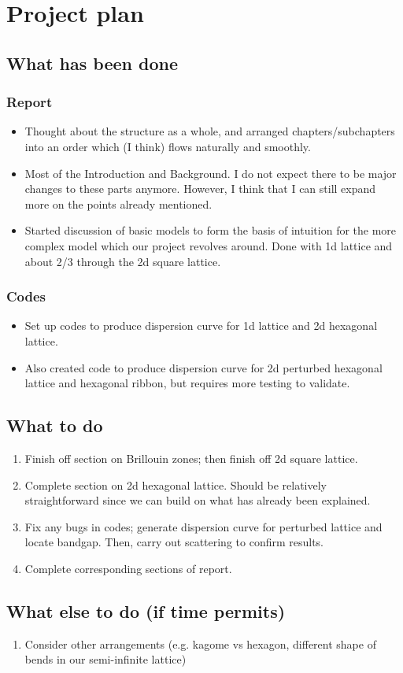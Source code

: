 \chapter{Project plan}

\section{What has been done}

\subsection{Report}
\begin{itemize}
  \item Thought about the structure as a whole, and arranged
        chapters/subchapters into an order which (I think) flows naturally and
        smoothly.
  \item Most of the Introduction and Background. I do not expect there to be
        major changes to these parts anymore. However, I think that I can still
        expand more on the points already mentioned.
  \item Started discussion of basic models to form the basis of intuition for
        the more complex model which our project revolves around. Done with 1d
        lattice and about 2/3 through the 2d square lattice.
\end{itemize}

\subsection{Codes}
\begin{itemize}
  \item Set up codes to produce dispersion curve for 1d lattice and 2d
        hexagonal lattice.
  \item Also created code to produce dispersion curve for 2d perturbed
        hexagonal lattice and hexagonal ribbon, but requires more testing to
        validate. 
\end{itemize}

\section{What to do}
\begin{enumerate}
  \item Finish off section on Brillouin zones; then finish off 2d square
        lattice.
  \item Complete section on 2d hexagonal lattice. Should be relatively
        straightforward since we can build on what has already been explained.
  \item Fix any bugs in codes; generate dispersion curve for perturbed lattice
        and locate bandgap. Then, carry out scattering to confirm results.
  \item Complete corresponding sections of report.
\end{enumerate}

\section{What else to do (if time permits)}
\begin{enumerate}
  \item Consider other arrangements (e.g. kagome vs hexagon, different shape of
        bends in our semi-infinite lattice)
\end{enumerate}


